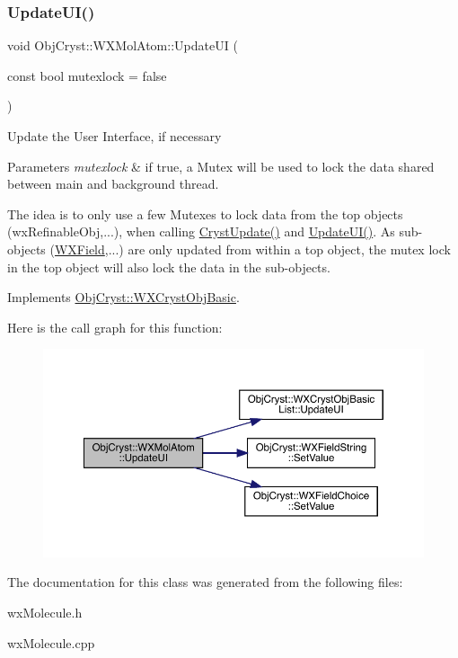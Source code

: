 \subsubsection{\texorpdfstring{UpdateUI()}{UpdateUI()}}
{\footnotesize\ttfamily void Obj\+Cryst\+::\+W\+X\+Mol\+Atom\+::\+Update\+UI (\begin{DoxyParamCaption}\item[{const bool}]{mutexlock = {\ttfamily false} }\end{DoxyParamCaption})\hspace{0.3cm}{\ttfamily [virtual]}}

Update the User Interface, if necessary


\begin{DoxyParams}{Parameters}
{\em mutexlock} & if true, a Mutex will be used to lock the data shared between main and background thread.\\
\hline
\end{DoxyParams}
The idea is to only use a few Mutexes to lock data from the top objects (wx\+Refinable\+Obj,...), when calling \mbox{\hyperlink{class_obj_cryst_1_1_w_x_mol_atom_a2b12f264ad4893b1f0b8381abe5b5742}{Cryst\+Update()}} and \mbox{\hyperlink{class_obj_cryst_1_1_w_x_mol_atom_a85a5d3b73dfd84fbba194f9eac7a40d5}{Update\+U\+I()}}. As sub-\/objects (\mbox{\hyperlink{class_obj_cryst_1_1_w_x_field}{W\+X\+Field}},...) are only updated from within a top object, the mutex lock in the top object will also lock the data in the sub-\/objects. 

Implements \mbox{\hyperlink{class_obj_cryst_1_1_w_x_cryst_obj_basic_a3818940b7031ff7e45cf2178c4a99c90}{Obj\+Cryst\+::\+W\+X\+Cryst\+Obj\+Basic}}.

Here is the call graph for this function\+:
\nopagebreak
\begin{figure}[H]
\begin{center}
\leavevmode
\includegraphics[width=350pt]{class_obj_cryst_1_1_w_x_mol_atom_a85a5d3b73dfd84fbba194f9eac7a40d5_cgraph}
\end{center}
\end{figure}


The documentation for this class was generated from the following files\+:\begin{DoxyCompactItemize}
\item 
wx\+Molecule.\+h\item 
wx\+Molecule.\+cpp\end{DoxyCompactItemize}
